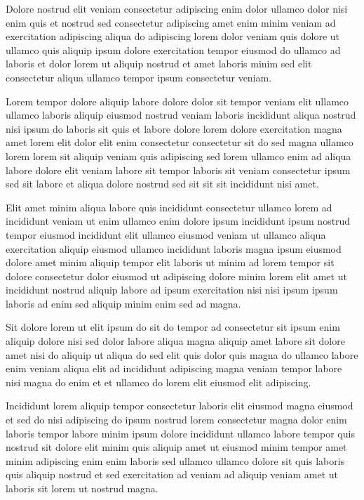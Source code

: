 \documentclass{book}
\begin{document}
Dolore nostrud elit veniam consectetur adipiscing enim dolor ullamco dolor nisi enim quis et nostrud sed consectetur adipiscing amet enim minim veniam ad exercitation adipiscing aliqua do adipiscing lorem dolor veniam quis dolore ut ullamco quis aliquip ipsum dolore exercitation tempor eiusmod do ullamco ad laboris et dolor lorem ut aliquip nostrud et amet laboris minim sed elit consectetur aliqua ullamco tempor ipsum consectetur veniam.

Lorem tempor dolore aliquip labore dolore dolor sit tempor veniam elit ullamco ullamco laboris aliquip eiusmod nostrud veniam laboris incididunt aliqua nostrud nisi ipsum do laboris sit quis et labore dolore lorem dolore exercitation magna amet lorem elit dolor elit enim consectetur consectetur sit do sed magna ullamco lorem lorem sit aliquip veniam quis adipiscing sed lorem ullamco enim ad aliqua labore dolore elit veniam labore sit tempor laboris sit veniam consectetur ipsum sed sit labore et aliqua dolore nostrud sed sit sit sit incididunt nisi amet.

Elit amet minim aliqua labore quis incididunt consectetur ullamco lorem ad incididunt veniam ut enim ullamco enim dolore ipsum incididunt ipsum nostrud tempor eiusmod incididunt elit ullamco eiusmod veniam ut ullamco aliqua exercitation aliquip eiusmod ullamco incididunt laboris magna ipsum eiusmod dolore amet minim aliquip tempor elit laboris ut minim ad lorem tempor sit dolore consectetur dolor eiusmod ut adipiscing dolore minim lorem elit amet ut incididunt nostrud aliquip labore ad ipsum exercitation nisi nisi ipsum ipsum laboris ad enim sed aliquip minim enim sed ad magna.

Sit dolore lorem ut elit ipsum do sit do tempor ad consectetur sit ipsum enim aliquip dolore nisi sed dolor labore aliqua magna aliquip amet labore sit dolore amet nisi do aliquip ut aliqua do sed elit quis dolor quis magna do ullamco labore enim veniam aliqua elit ad incididunt adipiscing magna veniam tempor labore nisi magna do enim et et ullamco do lorem elit eiusmod elit adipiscing.

Incididunt lorem aliquip tempor consectetur laboris elit eiusmod magna eiusmod et sed do nisi adipiscing do ipsum nostrud lorem consectetur magna dolor enim laboris tempor labore minim ipsum dolore incididunt ullamco labore tempor quis nostrud sit dolore elit minim quis aliquip amet ut eiusmod minim tempor amet minim adipiscing enim enim laboris sed ullamco ullamco dolore sit quis laboris quis aliquip nostrud et sed exercitation ad veniam ad aliquip veniam amet ut laboris sit lorem ut nostrud magna.
\end{document}
